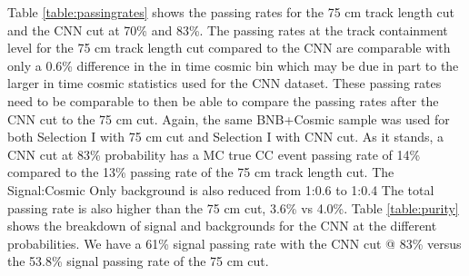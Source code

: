 \begin{table}[htp!]
\centering
{}
\caption{Signal and background event numbers of Selection I and Selection I with CNN cut estimated from a BNB+Cosmic sample and Cosmic only sample normalized to $5*10^{19}$ PoT. The last column gives the fraction of this signal or background type to the total selected events per CNN probability.} 
\label{table:purity} %
\end{table}

Table \ref{table:passingrates} shows the passing rates for the 75 cm track length cut and the CNN cut at 70\% and 83\%. The passing rates at the track containment level for the 75 cm track length cut compared to the CNN are comparable with only a 0.6\% difference in the in time cosmic bin which may be due in part to the larger in time cosmic statistics used for the CNN dataset. These passing rates need to be comparable to then be able to compare the passing rates after the CNN cut to the 75 cm cut. Again, the same BNB+Cosmic sample was used for both Selection I with 75 cm cut and Selection I with CNN cut. As it stands, a CNN cut at 83\% probability has a MC true CC event passing rate of 14\% compared to the 13\% passing rate of the 75 cm track length cut. The Signal:Cosmic Only background is also reduced from 1:0.6 to 1:0.4 The total passing rate is also higher than the 75 cm cut, 3.6\% vs 4.0\%. Table \ref{table:purity} shows the breakdown of signal and backgrounds for the CNN at the different probabilities. We have a 61\% signal passing rate with the CNN cut @ 83\% versus the 53.8\% signal passing rate of the 75 cm cut. 

